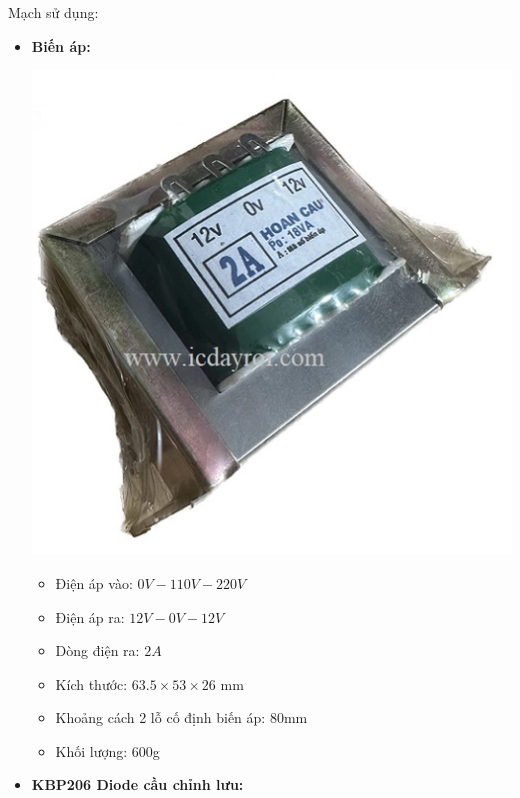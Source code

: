 	Mạch sử dụng:
	
	\begin{itemize}[label= - ]
		\item \textbf{Biến áp:}
		
		\begin{minipage}{0.3\linewidth}
			\includegraphics[width=\linewidth]{./picture/transformer_12V.png}
		\end{minipage}
		\begin{minipage}{0.7\linewidth}		
			\begin{itemize}[label = -]
				\item Điện áp vào: $0V - 110V - 220V$
				\item Điện áp ra: $12V - 0V - 12V$
				\item Dòng điện ra: $2A$
				\item Kích thước: $63.5 \times 53 \times 26$ mm
				\item Khoảng cách 2 lỗ cố định biến áp: $80$mm
				\item Khối lượng: $600$g
			\end{itemize}
		\end{minipage}
		\item \textbf{KBP206 Diode cầu chỉnh lưu:}
		

\end{itemize}
